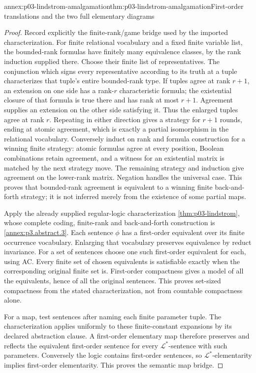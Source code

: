 \begin{annexitem}{annex:p03-lindstrom-amalgamation}{thm:p03-lindstrom-amalgamation}{First-order translations and the two full elementary diagrams}
\begin{proof}
Record explicitly the finite-rank/game bridge used by the imported
characterization. For finite relational vocabulary and a fixed finite
variable list, the bounded-rank formulas have finitely many equivalence
classes, by the rank induction supplied there. Choose their finite list
of representatives. The conjunction which signs every representative
according to its truth at a tuple characterizes that tuple's entire
bounded-rank type. If tuples agree at rank \(r+1\), an extension on
one side has a rank-\(r\) characteristic formula; the existential
closure of that formula is true there and has rank at most \(r+1\).
Agreement supplies an extension on the other side satisfying it. Thus
the enlarged tuples agree at rank \(r\). Repeating in either direction
gives a strategy for \(r+1\) rounds, ending at atomic agreement, which
is exactly a partial isomorphism in the relational vocabulary.
Conversely induct on rank and formula construction for a winning finite
strategy: atomic formulas agree at every position, Boolean combinations
retain agreement, and a witness for an existential matrix is matched by
the next strategy move. The remaining strategy and induction give
agreement on the lower-rank matrix. Negation handles the universal case.
This proves that bounded-rank agreement is equivalent to a winning
finite back-and-forth strategy; it is not inferred merely from the
existence of some partial maps.

Apply the already supplied regular-logic characterization
\cref{thm:p03-lindstrom}, whose complete coding, finite-rank and
back-and-forth construction is \cref{annex:p3.abstract.3}.
Each sentence \(\phi\) has a first-order equivalent over its finite
occurrence vocabulary. Enlarging that vocabulary preserves equivalence
by reduct invariance. For a set of sentences choose one such first-order
equivalent for each, using AC. Every finite set of chosen equivalents is
satisfiable exactly when the corresponding original finite set is.
First-order compactness gives a model of all the equivalents, hence of
all the original sentences. This proves set-sized compactness from the
stated characterization, not from countable compactness alone.

For a map, test sentences after naming each finite parameter tuple.
The characterization applies uniformly to these finite-constant expansions
by its declared abstraction clause. A first-order elementary map therefore
preserves and reflects the equivalent first-order sentence for every
\(\mathcal L^*\)-sentence with such parameters. Conversely the logic
contains first-order sentences, so \(\mathcal L^*\)-elementarity
implies first-order elementarity. This proves the semantic map bridge.


\end{proof}
\end{annexitem}
